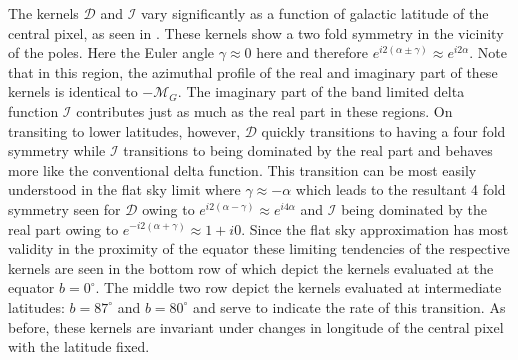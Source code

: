 %

The kernels $\mathcal{D}$ and $\mathcal{I}$ vary significantly as a function of galactic latitude of the central pixel, as seen in . These kernels show a two fold symmetry in the vicinity of the poles.  Here the Euler angle $\gamma \approx 0$ here and therefore $e^{i2(\alpha \pm \gamma)} \approx e^{i2\alpha}$. Note that in this region, the azimuthal profile of the real and imaginary part of these kernels is identical to $-\mathcal{M}_G$.  The imaginary part of the band limited delta function $\mathcal{I}$ contributes just as much as the real part in these regions. On transiting to lower latitudes, however, $\mathcal{D}$ quickly transitions to having a four fold symmetry while $\mathcal{I}$ transitions to being dominated by the real part and behaves more like the conventional delta function. This transition can be most easily understood in the flat sky limit where $\gamma \approx -\alpha$ which leads to the resultant 4 fold symmetry seen for $\mathcal{D}$ owing to $e^{i2(\alpha - \gamma)} \approx e^{i4\alpha}$ and $\mathcal{I}$ being dominated by the real part owing to $e^{-i2(\alpha + \gamma)} \approx 1 + i0$. Since the flat sky approximation has most validity in the proximity of the equator these limiting tendencies of the respective kernels are seen in the bottom row of  which depict the kernels evaluated at the equator $b=0^{\circ}$. The middle two row depict the kernels evaluated at intermediate latitudes: $b=87^{\circ}$ and $b=80^{\circ}$ and serve to indicate the rate of this transition. As before, these kernels are invariant under changes in longitude of the central pixel with the latitude fixed.

